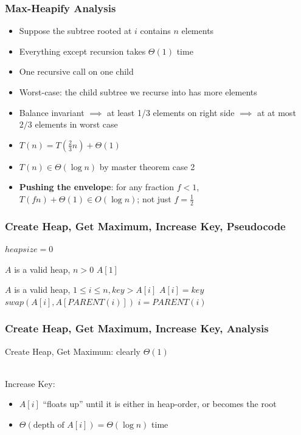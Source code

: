\documentclass{beamer}
\newcommand{\stanza}{ \\~\ }
\begin{document}
\begin{frame} \frametitle{Max-Heapify Analysis}
\begin{itemize}
  \item Suppose the subtree rooted at $i$ contains $n$ elements
  \item Everything except recursion takes $\Theta(1)$ time
  \item One recursive call on one child
  \item Worst-case: the child subtree we recurse into has more elements
  \item Balance invariant $\implies$ at least 1/3 elements on right side $\implies$ at at most $2/3$ elements in worst case
  \item $T(n) = T(\frac{2}{3}n) + \Theta(1)$
  \item $T(n) \in \Theta(\log n)$ by master theorem case 2
  \item \textbf{Pushing the envelope}: for any fraction $f<1$, $T(fn)+\Theta(1) \in O(\log n)$; not just $f=\frac{1}{2}$
\end{itemize}
\end{frame}

\begin{frame} \frametitle{Create Heap, Get Maximum, Increase Key, Pseudocode}
  {\small
\begin{algorithmic}[1]
  \State $heapsize = 0$
  \EndFunction
\end{algorithmic}

\begin{algorithmic}[1]
  \Require $A$ is a valid heap, $n>0$
  \State \Return $A[1]$
  \EndFunction
\end{algorithmic}

\begin{algorithmic}[1]
  \Require $A$ is a valid heap, $1 \leq i \leq n, key > A[i]$
  \State $A[i] = key$
    \State $swap(A[i], A[PARENT(i)])$
    \State $i = PARENT(i)$
  \EndWhile
  \EndFunction
\end{algorithmic}
}
\end{frame}

\begin{frame} \frametitle{Create Heap, Get Maximum, Increase Key, Analysis}
Create Heap, Get Maximum: clearly $\Theta(1)$ \stanza

Increase Key:
\begin{itemize}
  \item $A[i]$ ``floats up'' until it is either in heap-order, or becomes the root
  \item $\Theta(\text{depth of } A[i]) = \Theta(\log n)$ time
\end{itemize}
\end{frame}
\end{document}
